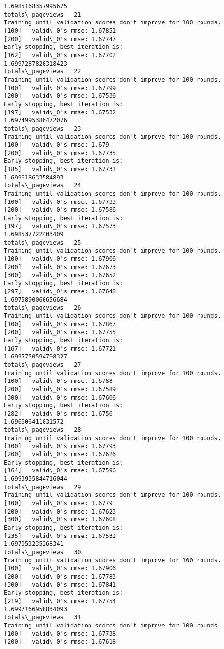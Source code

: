 \documentclass[11pt]{article}
\begin{document}
\begin{Verbatim}[commandchars=\\\{\}]
1.6985168357995675
totals\_pageviews   21
Training until validation scores don't improve for 100 rounds.
[100]	valid\_0's rmse: 1.67851
[200]	valid\_0's rmse: 1.67747
Early stopping, best iteration is:
[162]	valid\_0's rmse: 1.67702
1.6997287820318423
totals\_pageviews   22
Training until validation scores don't improve for 100 rounds.
[100]	valid\_0's rmse: 1.67799
[200]	valid\_0's rmse: 1.67536
Early stopping, best iteration is:
[197]	valid\_0's rmse: 1.67532
1.6974995386472076
totals\_pageviews   23
Training until validation scores don't improve for 100 rounds.
[100]	valid\_0's rmse: 1.679
[200]	valid\_0's rmse: 1.67735
Early stopping, best iteration is:
[185]	valid\_0's rmse: 1.67731
1.699618633584893
totals\_pageviews   24
Training until validation scores don't improve for 100 rounds.
[100]	valid\_0's rmse: 1.67733
[200]	valid\_0's rmse: 1.67586
Early stopping, best iteration is:
[197]	valid\_0's rmse: 1.67573
1.698537722403409
totals\_pageviews   25
Training until validation scores don't improve for 100 rounds.
[100]	valid\_0's rmse: 1.67906
[200]	valid\_0's rmse: 1.67673
[300]	valid\_0's rmse: 1.67652
Early stopping, best iteration is:
[297]	valid\_0's rmse: 1.67648
1.6975890060656684
totals\_pageviews   26
Training until validation scores don't improve for 100 rounds.
[100]	valid\_0's rmse: 1.67867
[200]	valid\_0's rmse: 1.67755
Early stopping, best iteration is:
[167]	valid\_0's rmse: 1.67721
1.6995750594798327
totals\_pageviews   27
Training until validation scores don't improve for 100 rounds.
[100]	valid\_0's rmse: 1.6788
[200]	valid\_0's rmse: 1.67589
[300]	valid\_0's rmse: 1.67606
Early stopping, best iteration is:
[282]	valid\_0's rmse: 1.6756
1.696606411031572
totals\_pageviews   28
Training until validation scores don't improve for 100 rounds.
[100]	valid\_0's rmse: 1.67793
[200]	valid\_0's rmse: 1.67626
Early stopping, best iteration is:
[164]	valid\_0's rmse: 1.67596
1.6993955844716044
totals\_pageviews   29
Training until validation scores don't improve for 100 rounds.
[100]	valid\_0's rmse: 1.6779
[200]	valid\_0's rmse: 1.67623
[300]	valid\_0's rmse: 1.67608
Early stopping, best iteration is:
[235]	valid\_0's rmse: 1.67532
1.697053235268341
totals\_pageviews   30
Training until validation scores don't improve for 100 rounds.
[100]	valid\_0's rmse: 1.67906
[200]	valid\_0's rmse: 1.67783
[300]	valid\_0's rmse: 1.67841
Early stopping, best iteration is:
[219]	valid\_0's rmse: 1.67754
1.6997166950834093
totals\_pageviews   31
Training until validation scores don't improve for 100 rounds.
[100]	valid\_0's rmse: 1.67738
[200]	valid\_0's rmse: 1.67618

\end{Verbatim}
\end{document}
